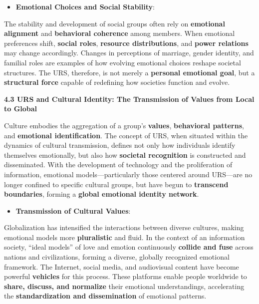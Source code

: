 \documentclass[
]{article}
\begin{document}
\begin{itemize}
\item
  \textbf{Emotional Choices and Social Stability}:
\end{itemize}

The stability and development of social groups often rely on
\textbf{emotional alignment} and \textbf{behavioral coherence} among
members. When emotional preferences shift, \textbf{social roles},
\textbf{resource distributions}, and \textbf{power relations} may change
accordingly. Changes in perceptions of marriage, gender identity, and
familial roles are examples of how evolving emotional choices reshape
societal structures. The URS, therefore, is not merely a
\textbf{personal emotional goal}, but a \textbf{structural force}
capable of redefining how societies function and evolve.

\textbf{4.3 URS and Cultural Identity: The Transmission of Values from
Local to Global}

Culture embodies the aggregation of a group's \textbf{values},
\textbf{behavioral patterns}, and \textbf{emotional identification}. The
concept of URS, when situated within the dynamics of cultural
transmission, defines not only how individuals identify themselves
emotionally, but also how \textbf{societal recognition} is constructed
and disseminated. With the development of technology and the
proliferation of information, emotional models---particularly those
centered around URS---are no longer confined to specific cultural
groups, but have begun to \textbf{transcend boundaries}, forming a
\textbf{global emotional identity network}.

\begin{itemize}
\item
  \textbf{Transmission of Cultural Values}:
\end{itemize}

Globalization has intensified the interactions between diverse cultures,
making emotional models more \textbf{pluralistic} and fluid. In the
context of an information society, ``ideal models'' of love and emotion
continuously \textbf{collide and fuse} across nations and civilizations,
forming a diverse, globally recognized emotional framework. The
Internet, social media, and audiovisual content have become powerful
\textbf{vehicles} for this process. These platforms enable people
worldwide to \textbf{share, discuss, and normalize} their emotional
understandings, accelerating the \textbf{standardization and
dissemination} of emotional patterns.
\end{document}
